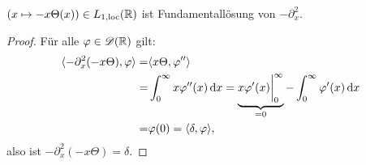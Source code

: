 \begin{bsp}[Fundamentallösung des Laplace-Operators für $n=1$]
  $(x\mapsto -x\Theta(x))\in L_{1,\scriptsize{\textnormal{loc}}}(\mathbb{R})$ ist Fundamentallösung von $-\partial^2_x$.

\begin{proof}
  Für alle $\varphi\in\mathscr{D}(\mathbb{R})$ gilt:
  \begin{align*}
    \langle-\partial^2_x(-x\Theta),\varphi\rangle=&\langle x\Theta,\varphi''\rangle \\
    =&\int_0^\infty x\varphi''(x)\,\mathrm{d} x=\underbrace{x\varphi'(x)\bigg|_0^\infty}_{=0}-\int_0^\infty\varphi'(x)\,\mathrm{d} x \\
    =&\varphi(0)=\langle \delta,\varphi\rangle,
  \end{align*}
  also ist $-\partial^2_x (-x \Theta) = \delta$.
\end{proof}
\end{bsp}


